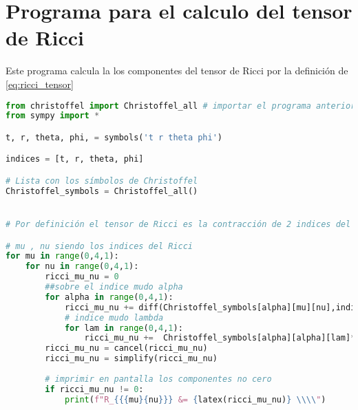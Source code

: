 \chapter{Programa para el calculo del tensor de Ricci}
\label{chap:programa_ricci}
Este programa calcula la los componentes del tensor de Ricci por la definición de \ref{eq:ricci_tensor}

\begin{lstlisting}[language=Python, caption=Programa para el calculo del tensor de Ricci]
from christoffel import Christoffel_all # importar el programa anterior
from sympy import *

t, r, theta, phi, = symbols('t r theta phi') 

indices = [t, r, theta, phi]

# Lista con los símbolos de Christoffel
Christoffel_symbols = Christoffel_all()


# Por definición el tensor de Ricci es la contracción de 2 indices del tensor de Riemann

# mu , nu siendo los indices del Ricci
for mu in range(0,4,1):
    for nu in range(0,4,1):
        ricci_mu_nu = 0
        ##sobre el indice mudo alpha
        for alpha in range(0,4,1):
            ricci_mu_nu += diff(Christoffel_symbols[alpha][mu][nu],indices[alpha]) -diff(Christoffel_symbols[alpha][mu][alpha],indices[nu]) 
            # indice mudo lambda
            for lam in range(0,4,1):
                ricci_mu_nu +=  Christoffel_symbols[alpha][alpha][lam]*Christoffel_symbols[lam][mu][nu] - Christoffel_symbols[alpha][nu][lam]*Christoffel_symbols[lam][mu][alpha]
        ricci_mu_nu = cancel(ricci_mu_nu)
        ricci_mu_nu = simplify(ricci_mu_nu)
 
        # imprimir en pantalla los componentes no cero
        if ricci_mu_nu != 0:
            print(f"R_{{{mu}{nu}}} &= {latex(ricci_mu_nu)} \\\\")
\end{lstlisting}




